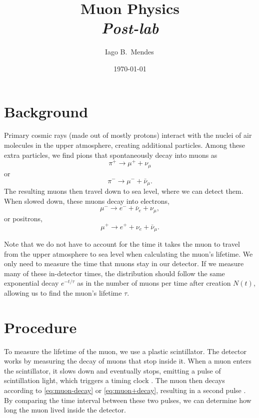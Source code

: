 \documentclass{../paper}
\begin{document}
\title{Muon Physics \\ {\em Post-lab}}

\author{Iago B.~Mendes\,}

\date{\today}

\maketitle

\section{Background}

Primary cosmic rays (made out of mostly protons) interact with the nuclei of air molecules in the upper atmosphere, creating additional particles. Among these extra particles, we find pions that spontaneously decay into muons as
\begin{equation}
  \pi^+ \to \mu^+ + \nu_\mu
\end{equation}
or
\begin{equation}
  \pi^- \to \mu^- + \bar\nu_\mu.
\end{equation}
The resulting muons then travel down to sea level, where we can detect them. When slowed down, these muons decay into electrons,
\begin{equation}\label{eq:muon-decay}
  \mu^- \to e^- + \bar\nu_e + \nu_\mu,
\end{equation}
or positrons,
\begin{equation}\label{eq:muon+decay}
  \mu^+ \to e^+ + \nu_e + \bar\nu_\mu.
\end{equation}

Note that we do not have to account for the time it takes the muon to travel from the upper atmosphere to sea level when calculating the muon's lifetime. We only need to measure the time that muons stay in our detector. If we measure many of these in-detector times, the distribution should follow the same exponential decay $e^{-t/\tau}$ as in the number of muons per time after creation $N(t)$, allowing us to find the muon's lifetime $\tau$.

\section{Procedure}

To measure the lifetime of the muon, we use a plastic scintillator. The detector works by measuring the decay of muons that stop inside it. When a muon enters the scintillator, it slows down and eventually stops, emitting a pulse of scintillation light, which triggers a timing clock \cite{TeachSpinManual}. The muon then decays according to \eqref{eq:muon-decay} or \eqref{eq:muon+decay}, resulting in a second pulse \cite{TeachSpinManual}. By comparing the time interval between these two pulses, we can determine how long the muon lived inside the detector.
\end{document}
